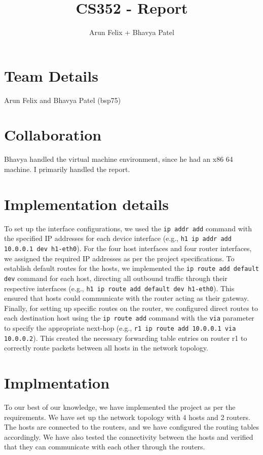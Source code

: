 \documentclass{article}
\title{CS352 - Report}
\author{Arun Felix + Bhavya Patel}
\begin{document}
\maketitle
\section{Team Details}

Arun Felix and Bhavya Patel (bsp75)

\section{Collaboration}

Bhavya handled the virtual machine environment, since he had an x86 64 machine. I primarily handled the report.

\section{Implementation details}
To set up the interface configurations, we used the \texttt{ip addr add} command with the specified IP addresses for each device interface (e.g., \texttt{h1 ip addr add 10.0.0.1 dev h1-eth0}). For the four host interfaces and four router interfaces, we assigned the required IP addresses as per the project specifications. To establish default routes for the hosts, we implemented the \texttt{ip route add default dev} command for each host, directing all outbound traffic through their respective interfaces (e.g., \texttt{h1 ip route add default dev h1-eth0}). This ensured that hosts could communicate with the router acting as their gateway. Finally, for setting up specific routes on the router, we configured direct routes to each destination host using the \texttt{ip route add} command with the \texttt{via} parameter to specify the appropriate next-hop (e.g., \texttt{r1 ip route add 10.0.0.1 via 10.0.0.2}). This created the necessary forwarding table entries on router r1 to correctly route packets between all hosts in the network topology.

\section{Implmentation}
To our best of our knowledge, we have implemented the project as per the requirements. We have set up the network topology with 4 hosts and 2 routers. The hosts are connected to the routers, and we have configured the routing tables accordingly. We have also tested the connectivity between the hosts and verified that they can communicate with each other through the routers.
\end{document}
